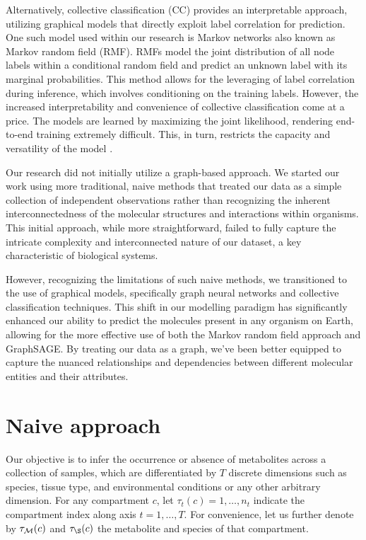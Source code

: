 \documentclass[
11pt, %
english, %
singlespacing, %
headsepline, %
chapterinoneline, %
]{MastersDoctoralThesis} %
\def\M{{\cal M}}
\begin{document}
Alternatively, collective classification (CC) provides an interpretable approach, utilizing graphical models that directly exploit label correlation for prediction. One such model used within our research is Markov networks also known as Markov random field (RMF). RMFs model the joint distribution of all node labels within a conditional random field and predict an unknown label with its marginal probabilities. This method allows for the leveraging of label correlation during inference, which involves conditioning on the training labels. However, the increased interpretability and convenience of collective classification come at a price. The models are learned by maximizing the joint likelihood, rendering end-to-end training extremely difficult. This, in turn, restricts the capacity and versatility of the model \cite{jiaGraphBeliefPropagation2021}.

Our research did not initially utilize a graph-based approach. We started our work using more traditional, naive methods that treated our data as a simple collection of independent observations rather than recognizing the inherent interconnectedness of the molecular structures and interactions within organisms. This initial approach, while more straightforward, failed to fully capture the intricate complexity and interconnected nature of our dataset, a key characteristic of biological systems.

However, recognizing the limitations of such naive methods, we transitioned to the use of graphical models, specifically graph neural networks and collective classification techniques. This shift in our modelling paradigm has significantly enhanced our ability to predict the molecules present in any organism on Earth, allowing for the more effective use of both the Markov random field approach and GraphSAGE. By treating our data as a graph, we've been better equipped to capture the nuanced relationships and dependencies between different molecular entities and their attributes.

\section{Naive approach}\label{sec:methods:Naive approach}
Our objective is to infer the occurrence or absence of metabolites across a collection of samples, which are differentiated by $T$ discrete dimensions such as species, tissue type, and environmental conditions or any other arbitrary dimension. For any compartment $c$, let $\tau_t(c) = 1, \ldots, n_t$ indicate the compartment index along axis $t=1, \ldots, T$. For convenience, let us further denote by $\tau_\M(c)$ and $\tau_\S(c)$ the metabolite and species of that compartment.
\end{document}
